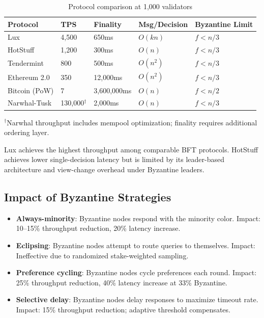 \documentclass[11pt,a4paper]{article}
\begin{document}
\begin{table}[h]
\centering
\caption{Protocol comparison at 1,000 validators}
\label{tab:comparison}
\begin{tabular}{@{}lllll@{}}
\toprule
Protocol & TPS & Finality & Msg/Decision & Byzantine Limit \\
\midrule
Lux & 4,500 & 650ms & $O(kn)$ & $f < n/3$ \\
HotStuff & 1,200 & 300ms & $O(n)$ & $f < n/3$ \\
Tendermint & 800 & 500ms & $O(n^2)$ & $f < n/3$ \\
Ethereum 2.0 & 350 & 12,000ms & $O(n^2)$ & $f < n/3$ \\
Bitcoin (PoW) & 7 & 3,600,000ms & $O(n)$ & $f < n/2$ \\
Narwhal-Tusk & 130,000$^\dagger$ & 2,000ms & $O(n)$ & $f < n/3$ \\
\bottomrule
\end{tabular}
\smallskip
\newline $^\dagger$Narwhal throughput includes mempool optimization; finality requires additional ordering layer.
\end{table}

Lux achieves the highest throughput among comparable BFT protocols. HotStuff achieves
lower single-decision latency but is limited by its leader-based architecture and
view-change overhead under Byzantine leaders.

\subsection{Impact of Byzantine Strategies}

\begin{itemize}
\item \textbf{Always-minority}: Byzantine nodes respond with the minority color.
Impact: 10--15\% throughput reduction, 20\% latency increase.
\item \textbf{Eclipsing}: Byzantine nodes attempt to route queries to themselves.
Impact: Ineffective due to randomized stake-weighted sampling.
\item \textbf{Preference cycling}: Byzantine nodes cycle preferences each round.
Impact: 25\% throughput reduction, 40\% latency increase at 33\% Byzantine.
\item \textbf{Selective delay}: Byzantine nodes delay responses to maximize timeout rate.
Impact: 15\% throughput reduction; adaptive threshold compensates.
\end{itemize}
\end{document}
